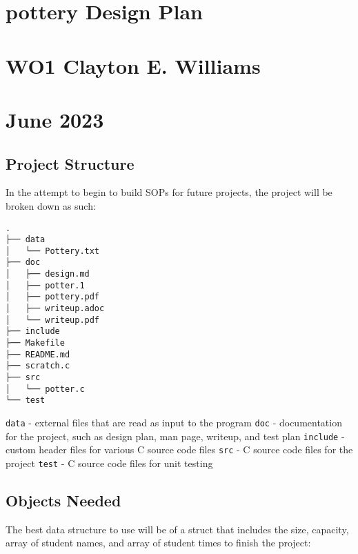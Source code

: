 \hypertarget{pottery-design-plan}{%
\section{pottery Design Plan}\label{pottery-design-plan}}

\hypertarget{wo1-clayton-e.-williams}{%
\section{WO1 Clayton E. Williams}\label{wo1-clayton-e.-williams}}

\hypertarget{june-2023}{%
\section{June 2023}\label{june-2023}}

\hypertarget{project-structure}{%
\subsection{Project Structure}\label{project-structure}}

In the attempt to begin to build SOPs for future projects, the project
will be broken down as such:

\begin{verbatim}
.
├── data
│   └── Pottery.txt
├── doc
│   ├── design.md
│   ├── potter.1
│   ├── pottery.pdf
│   ├── writeup.adoc
│   └── writeup.pdf
├── include
├── Makefile
├── README.md
├── scratch.c
├── src
│   └── potter.c
└── test
\end{verbatim}

\texttt{data} - external files that are read as input to the program
\texttt{doc} - documentation for the project, such as design plan, man
page, writeup, and test plan \texttt{include} - custom header files for
various C source code files \texttt{src} - C source code files for the
project \texttt{test} - C source code files for unit testing

\hypertarget{objects-needed}{%
\subsection{Objects Needed}\label{objects-needed}}

The best data structure to use will be of a struct that includes the
size, capacity, array of student names, and array of student times to
finish the project:

\begin{Shaded}
\begin{Highlighting}[]
 \OperatorTok{\{}
    \OperatorTok{;}
    \OperatorTok{;}
     \OperatorTok{**}\OperatorTok{;}
     \OperatorTok{*}\OperatorTok{;}
\OperatorTok{\}}\OperatorTok{;}
\end{Highlighting}
\end{Shaded}

